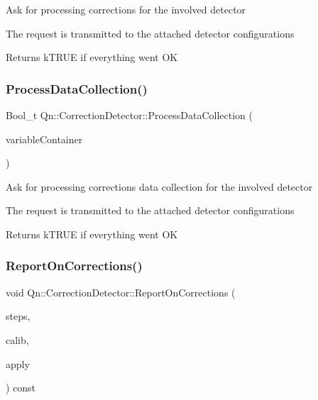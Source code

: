 Ask for processing corrections for the involved detector

The request is transmitted to the attached detector configurations \begin{DoxyReturn}{Returns}
k\+T\+R\+UE if everything went OK 
\end{DoxyReturn}
\mbox{\label{classQn_1_1CorrectionDetector_a8415d9c428d7a168cc953da44b6a5e01}} 
\subsubsection{\texorpdfstring{Process\+Data\+Collection()}{ProcessDataCollection()}}
{\footnotesize\ttfamily Bool\+\_\+t Qn\+::\+Correction\+Detector\+::\+Process\+Data\+Collection (\begin{DoxyParamCaption}\item[{const double $\ast$}]{variable\+Container }\end{DoxyParamCaption})\hspace{0.3cm}{\ttfamily [inline]}}

Ask for processing corrections data collection for the involved detector

The request is transmitted to the attached detector configurations \begin{DoxyReturn}{Returns}
k\+T\+R\+UE if everything went OK 
\end{DoxyReturn}
\mbox{\label{classQn_1_1CorrectionDetector_afbfcc072f1ba0d4b6c42a62daeb5a58e}} 
\subsubsection{\texorpdfstring{Report\+On\+Corrections()}{ReportOnCorrections()}}
{\footnotesize\ttfamily void Qn\+::\+Correction\+Detector\+::\+Report\+On\+Corrections (\begin{DoxyParamCaption}\item[{T\+List $\ast$}]{steps,  }\item[{T\+List $\ast$}]{calib,  }\item[{T\+List $\ast$}]{apply }\end{DoxyParamCaption}) const\hspace{0.3cm}{\ttfamily [virtual]}}

